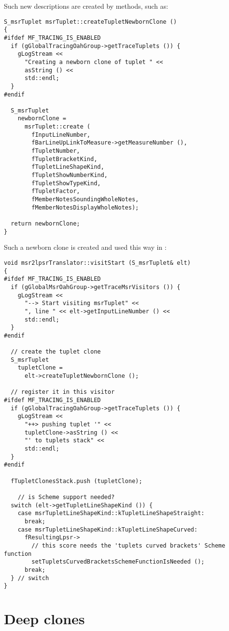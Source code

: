 Such new descriptions are created by  methods, such as:
\begin{lstlisting}[language=CPlusPlus]
S_msrTuplet msrTuplet::createTupletNewbornClone ()
{
#ifdef MF_TRACING_IS_ENABLED
  if (gGlobalTracingOahGroup->getTraceTuplets ()) {
    gLogStream <<
      "Creating a newborn clone of tuplet " <<
      asString () <<
      std::endl;
  }
#endif

  S_msrTuplet
    newbornClone =
      msrTuplet::create (
        fInputLineNumber,
        fBarLineUpLinkToMeasure->getMeasureNumber (),
        fTupletNumber,
        fTupletBracketKind,
        fTupletLineShapeKind,
        fTupletShowNumberKind,
        fTupletShowTypeKind,
        fTupletFactor,
        fMemberNotesSoundingWholeNotes,
        fMemberNotesDisplayWholeNotes);

  return newbornClone;
}
\end{lstlisting}

Such a newborn clone is created and used this way in \method{}{}:
\begin{lstlisting}[language=CPlusPlus]
void msr2lpsrTranslator::visitStart (S_msrTuplet& elt)
{
#ifdef MF_TRACING_IS_ENABLED
  if (gGlobalMsrOahGroup->getTraceMsrVisitors ()) {
    gLogStream <<
      "--> Start visiting msrTuplet" <<
      ", line " << elt->getInputLineNumber () <<
      std::endl;
  }
#endif

  // create the tuplet clone
  S_msrTuplet
    tupletClone =
      elt->createTupletNewbornClone ();

  // register it in this visitor
#ifdef MF_TRACING_IS_ENABLED
  if (gGlobalTracingOahGroup->getTraceTuplets ()) {
    gLogStream <<
      "++> pushing tuplet '" <<
      tupletClone->asString () <<
      "' to tuplets stack" <<
      std::endl;
  }
#endif

  fTupletClonesStack.push (tupletClone);

	// is Scheme support needed?
  switch (elt->getTupletLineShapeKind ()) {
    case msrTupletLineShapeKind::kTupletLineShapeStraight:
      break;
    case msrTupletLineShapeKind::kTupletLineShapeCurved:
      fResultingLpsr->
        // this score needs the 'tuplets curved brackets' Scheme function
        setTupletsCurvedBracketsSchemeFunctionIsNeeded ();
      break;
  } // switch
}
\end{lstlisting}


\section{Deep clones}

